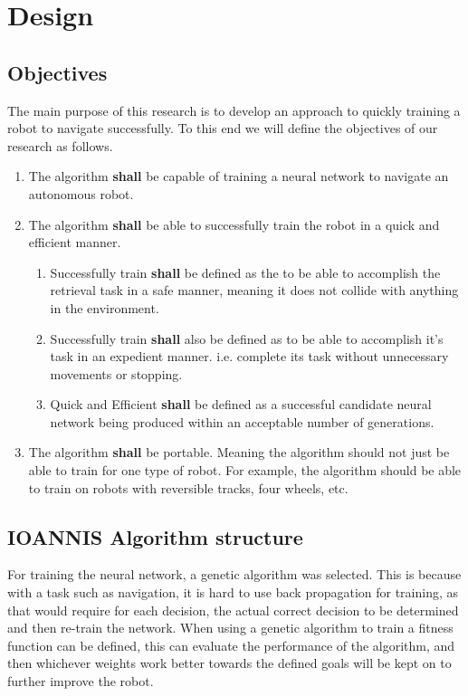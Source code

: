 \section{Design}
\subsection{Objectives}
The main purpose of this research is to develop an approach to quickly training a robot to navigate successfully. To this end we will define the objectives of our research as follows.
\begin{enumerate}
	\item The algorithm \textbf{shall} be capable of training a neural network to navigate an autonomous robot.
	\item The algorithm \textbf{shall} be able to successfully train the robot in a quick and efficient manner. 
	\begin{enumerate}
		\item Successfully train \textbf{shall} be defined as the to be able to accomplish the retrieval task in a safe manner, meaning it does not collide with anything in the environment. 		
		\item Successfully train \textbf{shall} also be defined as to be able to accomplish it's task in an expedient manner. i.e. complete its task without unnecessary movements or stopping.
		\item Quick and Efficient \textbf{shall} be defined as a successful candidate neural network being produced within an acceptable number of generations. 
	\end{enumerate}
	\item The algorithm \textbf{shall} be portable. Meaning the algorithm should not just be able to train for one type of robot. For example, the algorithm should be able to train on robots with reversible tracks, four wheels, etc.
\end{enumerate}

\subsection{IOANNIS Algorithm structure}
For training the neural network, a genetic algorithm was selected. This is because with a task such as navigation, it is hard to use back propagation for training, as that would require for each decision, the actual correct decision to be determined and then re-train the network. When using a genetic algorithm to train a fitness function can be defined, this can evaluate the performance of the algorithm, and then whichever weights work better towards the defined goals will be kept on to further improve the robot. 

